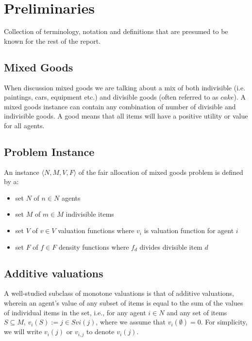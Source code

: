 \section{Preliminaries}\label{sec:preliminaries}

Collection of terminology, notation and definitions that are presumed to be known for the rest of the report.


\subsection*{Mixed Goods}
When discussion mixed goods we are talking about a mix of both indivisible (i.e. paintings, cars, equipment etc.) and divisible goods (often referred to as $cake$). A mixed goods instance can contain any combination of number of divisible and indivisible goods. A good means that all items will have a positive utility or value for all agents.



\subsection*{Problem Instance}
An instance $\langle N, M, V, F \rangle$ of the fair allocation of mixed goods problem is defined by a:
\begin{itemize}
    \item set $N$ of $n \in N$ agents
    \item set $M$ of $m \in M$ indivisible items
    \item set $V$ of $v \in V$ valuation functions where $v_i$ is valuation function for agent $i$
    \item set $F$ of $f \in F$ density functions where $f_d$ divides divisible item $d$
\end{itemize}



\subsection*{Additive valuations}
A well-studied subclass of monotone valuations is that of additive valuations, wherein an agent's value of any subset of items is equal to the sum of the values of individual items in the set, i.e., for any agent $i \in N$ and any set of items $S \subseteq M$, $v_i(S) := j \in S vi({j})$, where we assume that $v_i(\emptyset) = 0$. For simplicity, we will write $v_i(j)$ or $v_{i,j}$ to denote $v_i({j})$.




